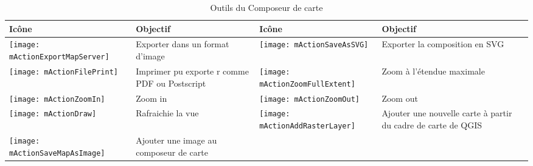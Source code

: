 \begin{table}[h]
\centering
\caption{Outils du Composeur de carte}\label{tab:printcomposer_tools}\medskip
 \begin{tabular}{|l|p{6.9cm}|l|p{6.9cm}|}
 \hline \textbf{Ic\^one} & \textbf{Objectif} & \textbf{Ic\^one} &
 \textbf{Objectif} \\
 
\hline \texttt{[image: mActionExportMapServer]}  & Exporter dans un
format d'image & 
 \texttt{[image: mActionSaveAsSVG]} & Exporter la composition en 
SVG \\
 \hline \texttt{[image: mActionFilePrint]} & Imprimer pu exporte
r comme PDF ou Postscript &
\texttt{[image: mActionZoomFullExtent]} & Zoom \`a l'\'etendue
maximale\\
\hline \texttt{[image: mActionZoomIn]} & Zoom in &
 \texttt{[image: mActionZoomOut]} & Zoom out \\
 \hline \texttt{[image: mActionDraw]} & Rafraichie la vue &
 \texttt{[image: mActionAddRasterLayer]} & Ajouter une nouvelle 
carte \`a partir du cadre de carte de QGIS \\
 \hline \texttt{[image: mActionSaveMapAsImage]} & Ajouter une image
au composeur de carte &

\end{tabular}
\end{table}
